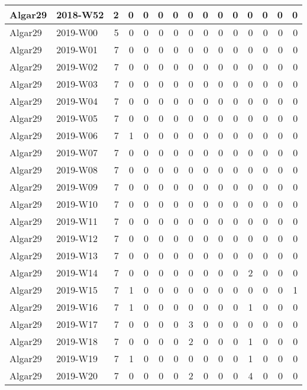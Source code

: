 \documentclass[]{book}
\begin{document}
\begin{table}
\begin{tabular}[t]{l|l|r|r|r|r|r|r|r|r|r|r|r|r|r}
\hline
Algar29 & 2018-W52 & 2 & 0 & 0 & 0 & 0 & 0 & 0 & 0 & 0 & 0 & 0 & 0 & 0\\
\hline
Algar29 & 2019-W00 & 5 & 0 & 0 & 0 & 0 & 0 & 0 & 0 & 0 & 0 & 0 & 0 & 0\\
\hline
Algar29 & 2019-W01 & 7 & 0 & 0 & 0 & 0 & 0 & 0 & 0 & 0 & 0 & 0 & 0 & 0\\
\hline
Algar29 & 2019-W02 & 7 & 0 & 0 & 0 & 0 & 0 & 0 & 0 & 0 & 0 & 0 & 0 & 0\\
\hline
Algar29 & 2019-W03 & 7 & 0 & 0 & 0 & 0 & 0 & 0 & 0 & 0 & 0 & 0 & 0 & 0\\
\hline
Algar29 & 2019-W04 & 7 & 0 & 0 & 0 & 0 & 0 & 0 & 0 & 0 & 0 & 0 & 0 & 0\\
\hline
Algar29 & 2019-W05 & 7 & 0 & 0 & 0 & 0 & 0 & 0 & 0 & 0 & 0 & 0 & 0 & 0\\
\hline
Algar29 & 2019-W06 & 7 & 1 & 0 & 0 & 0 & 0 & 0 & 0 & 0 & 0 & 0 & 0 & 0\\
\hline
Algar29 & 2019-W07 & 7 & 0 & 0 & 0 & 0 & 0 & 0 & 0 & 0 & 0 & 0 & 0 & 0\\
\hline
Algar29 & 2019-W08 & 7 & 0 & 0 & 0 & 0 & 0 & 0 & 0 & 0 & 0 & 0 & 0 & 0\\
\hline
Algar29 & 2019-W09 & 7 & 0 & 0 & 0 & 0 & 0 & 0 & 0 & 0 & 0 & 0 & 0 & 0\\
\hline
Algar29 & 2019-W10 & 7 & 0 & 0 & 0 & 0 & 0 & 0 & 0 & 0 & 0 & 0 & 0 & 0\\
\hline
Algar29 & 2019-W11 & 7 & 0 & 0 & 0 & 0 & 0 & 0 & 0 & 0 & 0 & 0 & 0 & 0\\
\hline
Algar29 & 2019-W12 & 7 & 0 & 0 & 0 & 0 & 0 & 0 & 0 & 0 & 0 & 0 & 0 & 0\\
\hline
Algar29 & 2019-W13 & 7 & 0 & 0 & 0 & 0 & 0 & 0 & 0 & 0 & 0 & 0 & 0 & 0\\
\hline
Algar29 & 2019-W14 & 7 & 0 & 0 & 0 & 0 & 0 & 0 & 0 & 0 & 2 & 0 & 0 & 0\\
\hline
Algar29 & 2019-W15 & 7 & 1 & 0 & 0 & 0 & 0 & 0 & 0 & 0 & 0 & 0 & 0 & 1\\
\hline
Algar29 & 2019-W16 & 7 & 1 & 0 & 0 & 0 & 0 & 0 & 0 & 0 & 1 & 0 & 0 & 0\\
\hline
Algar29 & 2019-W17 & 7 & 0 & 0 & 0 & 0 & 3 & 0 & 0 & 0 & 0 & 0 & 0 & 0\\
\hline
Algar29 & 2019-W18 & 7 & 0 & 0 & 0 & 0 & 2 & 0 & 0 & 0 & 1 & 0 & 0 & 0\\
\hline
Algar29 & 2019-W19 & 7 & 1 & 0 & 0 & 0 & 0 & 0 & 0 & 0 & 1 & 0 & 0 & 0\\
\hline
Algar29 & 2019-W20 & 7 & 0 & 0 & 0 & 0 & 2 & 0 & 0 & 0 & 4 & 0 & 0 & 0\\

\end{tabular}
\end{table}
\end{document}

